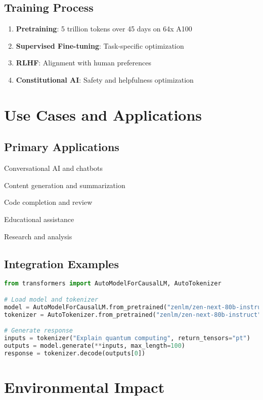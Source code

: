 \documentclass[11pt,a4paper]{article}
\begin{document}
\subsection{Training Process}
\begin{enumerate}
    \item \textbf{Pretraining}: 5 trillion tokens over 45 days on 64x A100
    \item \textbf{Supervised Fine-tuning}: Task-specific optimization
    \item \textbf{RLHF}: Alignment with human preferences
    \item \textbf{Constitutional AI}: Safety and helpfulness optimization
\end{enumerate}

\section{Use Cases and Applications}

\subsection{Primary Applications}
\item Conversational AI and chatbots
\item Content generation and summarization
\item Code completion and review
\item Educational assistance
\item Research and analysis

\subsection{Integration Examples}

\begin{lstlisting}[language=Python, caption=Basic Usage Example]
from transformers import AutoModelForCausalLM, AutoTokenizer

# Load model and tokenizer
model = AutoModelForCausalLM.from_pretrained("zenlm/zen-next-80b-instruct")
tokenizer = AutoTokenizer.from_pretrained("zenlm/zen-next-80b-instruct")

# Generate response
inputs = tokenizer("Explain quantum computing", return_tensors="pt")
outputs = model.generate(**inputs, max_length=100)
response = tokenizer.decode(outputs[0])
\end{lstlisting}

\section{Environmental Impact}
\end{document}
